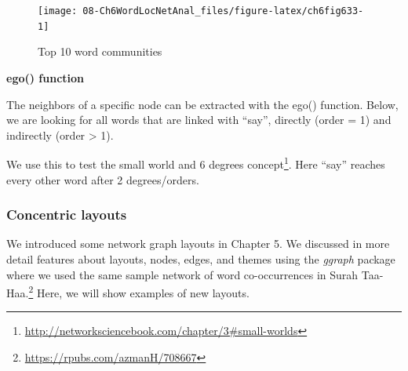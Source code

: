 \documentclass[
]{article}
\newenvironment{Shaded}{\begin{snugshade}}{\end{snugshade}}
\newcommand{\AttributeTok}[1]{\textcolor[rgb]{0.13,0.29,0.53}{#1}}
\newcommand{\CommentTok}[1]{\textcolor[rgb]{0.56,0.35,0.01}{\textit{#1}}}
\newcommand{\DecValTok}[1]{\textcolor[rgb]{0.00,0.00,0.81}{#1}}
\newcommand{\FunctionTok}[1]{\textcolor[rgb]{0.13,0.29,0.53}{\textbf{#1}}}
\newcommand{\NormalTok}[1]{#1}
\newcommand{\OtherTok}[1]{\textcolor[rgb]{0.56,0.35,0.01}{#1}}
\newcommand{\SpecialCharTok}[1]{\textcolor[rgb]{0.81,0.36,0.00}{\textbf{#1}}}
\newcommand{\StringTok}[1]{\textcolor[rgb]{0.31,0.60,0.02}{#1}}
\begin{document}
\begin{figure}

{\centering \texttt{[image: 08-Ch6WordLocNetAnal\_files/figure-latex/ch6fig633-1]} 

}

\caption{Top 10 word communities}\label{fig:ch6fig633}
\end{figure}

\textbf{ego() function}

The neighbors of a specific node can be extracted with the ego() function. Below, we are looking for all words that are linked with ``say'', directly (order = 1) and indirectly (order \textgreater{} 1).

\footnotesize

\begin{Shaded}
\end{Shaded}

\normalsize

We use this to test the small world and 6 degrees concept\footnote{\url{http://networksciencebook.com/chapter/3\#small-worlds}}. Here ``say'' reaches every other word after 2 degrees/orders.

\hypertarget{concentric-layouts}{%
\subsubsection{Concentric layouts}\label{concentric-layouts}}

We introduced some network graph layouts in Chapter 5. We discussed in more detail features about layouts, nodes, edges, and themes using the \emph{ggraph} package where we used the same sample network of word co-occurrences in Surah Taa-Haa.\footnote{\url{https://rpubs.com/azmanH/708667}} Here, we will show examples of new layouts.
\end{document}
